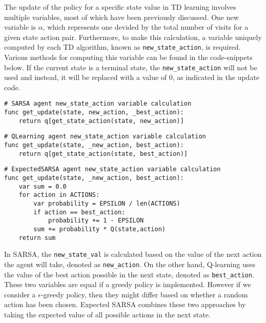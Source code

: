 The update of the policy for a specific state value in TD learning involves multiple variables, most of which have been previously discussed. One new variable is $\alpha$, which represents one devided by the total number of visits for a given state action pair. Furthermore, to make this calculation, a variable uniquely computed by each TD algorithm, known as \texttt{new\_state\_action}, is required. Various methods for computing this variable can be found in the code-snippets below. If the current state is a terminal state, the \texttt{new\_state\_action} will not be used and instead, it will be replaced with a value of 0, as indicated in the update code.

\begin{center}
\hrulefill
\begin{lstlisting}
# SARSA agent new_state_action variable calculation
func get_update(state, new_action, _best_action):
    return q[get_state_action(state, new_action)]
\end{lstlisting}
\hrulefill
\end{center}

\begin{center}
\hrulefill
\begin{lstlisting}
# QLearning agent new_state_action variable calculation
func get_update(state, _new_action, best_action):
    return q[get_state_action(state, best_action)]
\end{lstlisting}
\hrulefill
\end{center}

\begin{center}
\hrulefill
\begin{lstlisting}
# ExpectedSARSA agent new_state_action variable calculation
func get_update(state, _new_action, best_action):
    var sum = 0.0 
    for action in ACTIONS:
        var probability = EPSILON / len(ACTIONS)
        if action == best_action:
            probability += 1 - EPSILON
        sum += probability * Q(state,action)
    return sum
\end{lstlisting}
\hrulefill
\end{center}

In SARSA, the \texttt{new\_state\_val} is calculated based on the value of the next action the agent will take, denoted as \texttt{new\_action}. On the other hand, Q-learning uses the value of the best action possible in the next state, denoted as \texttt{best\_action}. These two variables are equal if a greedy policy is implemented. However if we consider a $\epsilon$-greedy policy, then they might differ based on whether a random action has been chosen. Expected SARSA combines these two approaches by taking the expected value of all possible actions in the next state. 

